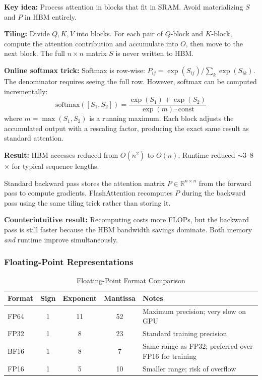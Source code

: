 \documentclass[11pt, a4paper]{article}
\begin{document}
\begin{defbox}
\textbf{Key idea:} Process attention in blocks that fit in SRAM. Avoid materializing $S$ and $P$ in HBM entirely.

\textbf{Tiling:} Divide $Q, K, V$ into blocks. For each pair of $Q$-block and $K$-block, compute the attention contribution and accumulate into $O$, then move to the next block. The full $n \times n$ matrix $S$ is never written to HBM.

\textbf{Online softmax trick:} Softmax is row-wise: $P_{ij} = \exp(S_{ij}) / \sum_k \exp(S_{ik})$. The denominator requires seeing the full row. However, softmax can be computed incrementally:
\[
\text{softmax}([S_1, S_2]) = \frac{\exp(S_1) + \exp(S_2)}{\exp(m) \cdot \text{const}}
\]
where $m = \max(S_1, S_2)$ is a running maximum. Each block adjusts the accumulated output with a rescaling factor, producing the exact same result as standard attention.

\textbf{Result:} HBM accesses reduced from $O(n^2)$ to $O(n)$. Runtime reduced $\sim$3--8$\times$ for typical sequence lengths.
\end{defbox}

\begin{defbox}
Standard backward pass stores the attention matrix $P \in \mathbb{R}^{n \times n}$ from the forward pass to compute gradients. FlashAttention recomputes $P$ during the backward pass using the same tiling trick rather than storing it.

\textbf{Counterintuitive result:} Recomputing costs more FLOPs, but the backward pass is still faster because the HBM bandwidth savings dominate. Both memory \emph{and} runtime improve simultaneously.
\end{defbox}

\subsubsection{Floating-Point Representations}

\begin{table}[h]
\centering
\caption{Floating-Point Format Comparison}
\begin{tabular}{@{}lcccp{4cm}@{}}
\toprule
\textbf{Format} & \textbf{Sign} & \textbf{Exponent} & \textbf{Mantissa} & \textbf{Notes} \\
\midrule
FP64 & 1 & 11 & 52 & Maximum precision; very slow on GPU \\
FP32 & 1 & 8 & 23 & Standard training precision \\
BF16 & 1 & 8 & 7 & Same range as FP32; preferred over FP16 for training \\
FP16 & 1 & 5 & 10 & Smaller range; risk of overflow \\
\bottomrule
\end{tabular}
\end{table}
\end{document}
